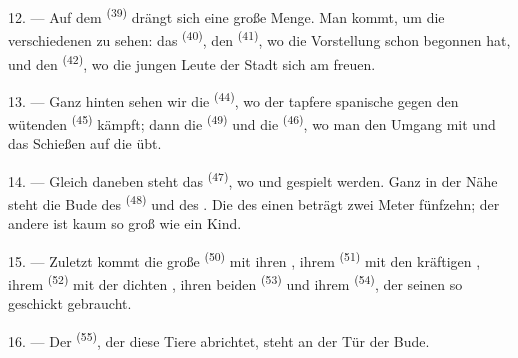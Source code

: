 12. --- Auf dem  \textsuperscript{(39)} drängt sich eine große
Menge. Man kommt, um die verschiedenen  zu sehen: das
 \textsuperscript{(40)}, den  \textsuperscript{(41)},
wo die Vorstellung schon begonnen hat, und den 
\textsuperscript{(42)}, wo die jungen Leute der Stadt sich am 
freuen.

13. --- Ganz hinten sehen wir die  \textsuperscript{(44)}, wo der
tapfere spanische  gegen den wütenden 
\textsuperscript{(45)} kämpft; dann die  \textsuperscript{(49)} und
die  \textsuperscript{(46)}, wo man den Umgang mit
 und das Schießen auf die  übt.

14. --- Gleich daneben steht das  \textsuperscript{(47)}, wo
 und  gespielt werden. Ganz in der Nähe steht die
Bude des  \textsuperscript{(48)} und des . Die
 des einen beträgt zwei Meter fünfzehn; der andere ist kaum so groß
wie ein Kind.

15. --- Zuletzt kommt die große  \textsuperscript{(50)} mit ihren
, ihrem  \textsuperscript{(51)} mit den
kräftigen , ihrem  \textsuperscript{(52)} mit der
dichten , ihren beiden  \textsuperscript{(53)} und
ihrem  \textsuperscript{(54)}, der seinen  so
geschickt gebraucht.

16. --- Der  \textsuperscript{(55)}, der diese Tiere abrichtet, steht
an der Tür der Bude.
\VUsaut{6.0mm}
\VUfilet{22mm}
